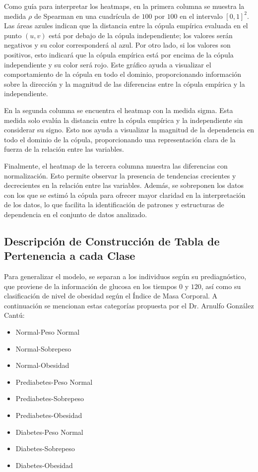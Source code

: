 Como guía para interpretar los heatmaps, en la primera columna se muestra la medida $\rho$ de Spearman en una cuadrícula de $100$ por $100$ en el intervalo $[0, 1]^2$. Las áreas azules indican que la distancia entre la cópula empírica evaluada en el punto $(u, v)$ está por debajo de la cópula independiente; los valores serán negativos y su color corresponderá al azul. Por otro lado, si los valores son positivos, esto indicará que la cópula empírica está por encima de la cópula independiente y su color será rojo. Este gráfico ayuda a visualizar el comportamiento de la cópula en todo el dominio, proporcionando información sobre la dirección y la magnitud de las diferencias entre la cópula empírica y la independiente.

En la segunda columna se encuentra el heatmap con la medida sigma. Esta medida solo evalúa la distancia entre la cópula empírica y la independiente sin considerar su signo. Esto nos ayuda a visualizar la magnitud de la dependencia en todo el dominio de la cópula, proporcionando una representación clara de la fuerza de la relación entre las variables.

Finalmente, el heatmap de la tercera columna muestra las diferencias con normalización. Esto permite observar la presencia de tendencias crecientes y decrecientes en la relación entre las variables. Además, se sobreponen los datos con los que se estimó la cópula para ofrecer mayor claridad en la interpretación de los datos, lo que facilita la identificación de patrones y estructuras de dependencia en el conjunto de datos analizado.


\subsection{Descripción de Construcción de Tabla de Pertenencia a cada Clase}

Para generalizar el modelo, se separan a los individuos según su prediagnóstico, que proviene de la información de glucosa en los tiempos $0$ y $120$, así como su clasificación de nivel de obesidad según el Índice de Masa Corporal. A continuación se mencionan estas categorías propuesta por el Dr. Arnulfo González Cantú:

\begin{multicols}{2}
    \begin{itemize}
        \item Normal-Peso Normal
        \item Normal-Sobrepeso
        \item Normal-Obesidad	
        \item Prediabetes-Peso Normal
        \item Prediabetes-Sobrepeso
        \item Prediabetes-Obesidad	
        \item Diabetes-Peso Normal	
        \item Diabetes-Sobrepeso
        \item Diabetes-Obesidad
    \end{itemize}
\end{multicols}

